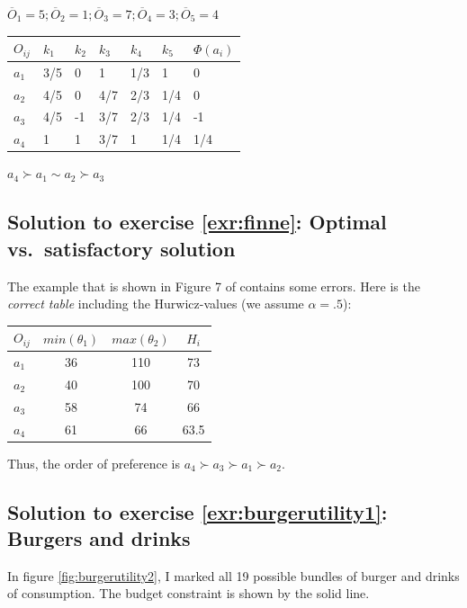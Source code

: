 \documentclass[
  12pt,
  oneside]{book}
\theoremstyle{definition}
\theoremstyle{definition}
\theoremstyle{definition}
\theoremstyle{definition}
\theoremstyle{remark}
\begin{document}
\(\overline{O}_1=5; \overline{O}_2=1; \overline{O}_3=7; \overline{O}_4=3; \overline{O}_5=4\)

\begin{longtable}[]{@{}lllllll@{}}
\toprule\noalign{}
\(O_{ij}\) & \(k_1\) & \(k_2\) & \(k_3\) & \(k_4\) & \(k_5\) & \(\Phi(a_i)\) \\
\midrule\noalign{}
\endhead
\bottomrule\noalign{}
\endlastfoot
\(a_1\) & 3/5 & 0 & 1 & 1/3 & 1 & 0 \\
\(a_2\) & 4/5 & 0 & 4/7 & 2/3 & 1/4 & 0 \\
\(a_3\) & 4/5 & -1 & 3/7 & 2/3 & 1/4 & -1 \\
\(a_4\) & 1 & 1 & 3/7 & 1 & 1/4 & 1/4 \\
\end{longtable}

\(a_4\succ a_1 \sim a_2 \succ a_3\)

\hypertarget{sol:finne}{%
\subsection*{Solution to exercise \ref{exr:finne}: Optimal vs.~satisfactory solution}\label{sol:finne}}

The example that is shown in Figure 7 of \citet[p.~401]{Finne1998three} contains some errors. Here is the \emph{correct table} including the Hurwicz-values (we assume \(\alpha=.5\)):

\begin{longtable}[]{@{}lccc@{}}
\toprule\noalign{}
\(O_{ij}\) & \(min(\theta_1)\) & \(max(\theta_2)\) & \(H_i\) \\
\midrule\noalign{}
\endhead
\bottomrule\noalign{}
\endlastfoot
\(a_1\) & 36 & 110 & 73 \\
\(a_2\) & 40 & 100 & 70 \\
\(a_3\) & 58 & 74 & 66 \\
\(a_4\) & 61 & 66 & 63.5 \\
\end{longtable}

Thus, the order of preference is \(a_4\succ a_3 \succ a_1 \succ a_2\).

\hypertarget{sol:burgerutility1}{%
\subsection*{Solution to exercise \ref{exr:burgerutility1}: Burgers and drinks}\label{sol:burgerutility1}}

In figure \ref{fig:burgerutility2}, I marked all 19 possible bundles of burger and drinks of consumption. The budget constraint is shown by the solid line.
\end{document}
